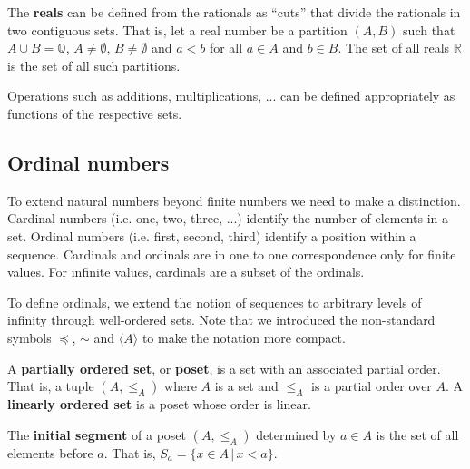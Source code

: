 \documentclass{article}
\newcommand{\marginleft}[1] {\reversemarginpar\marginpar{#1}}
\def\ordleq{\preceq}
\def\ordeq{\sim}
\begin{document}
\begin{defn}
	The \textbf{reals} can be defined from the rationals as ``cuts'' that divide the rationals in two contiguous sets. That is, let a real number be a partition $(A, B)$ such that $A \cup B = \mathbb{Q}$, $A \neq \emptyset$, $B \neq \emptyset$ and $a < b$ for all $a \in A$ and $b \in B$. The set of all reals $\mathbb{R}$ is the set of all such partitions.
\end{defn}

\begin{remark}
	Operations such as additions, multiplications, ... can be defined appropriately as functions of the respective sets.
\end{remark}

\subsection{Ordinal numbers}

To extend natural numbers beyond finite numbers we need to make a distinction. Cardinal numbers (i.e. one, two, three, ...) identify the number of elements in a set. Ordinal numbers (i.e. first, second, third) identify a position within a sequence. Cardinals and ordinals are in one to one correspondence only for finite values. For infinite values, cardinals are a subset of the ordinals.

\begin{remark}
	To define ordinals, we extend the notion of sequences to arbitrary levels of infinity through well-ordered sets. Note that we introduced the non-standard symbols $\ordleq$, $\ordeq$ and $\langle A \rangle$ to make the notation more compact.
\end{remark}

\begin{defn}[Poset]
	A \textbf{partially ordered set}, \marginleft{Poset: $(A, \leq_A)$} or \textbf{poset}, is a set with an associated partial order. That is, a tuple $(A, \leq_A)$ where $A$ is a set and $\leq_A$ is a partial order over $A$. A \textbf{linearly ordered set} is a poset whose order is linear.
\end{defn}

\begin{defn}
	The \textbf{initial segment} \marginleft{Initial segment} of a poset $(A, \leq_A)$ determined by $a \in A$ is the set of all elements before $a$. That is, $S_a=\{ x \in A \, | \, x < a \}$.
\end{defn}
\end{document}
